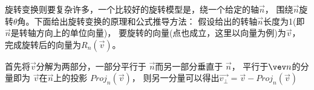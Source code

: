 \documentclass[UTF8]{ctexart}
\begin{document}
旋转变换则要复杂许多，一个比较好的旋转模型是，绕一个给定的轴$\vec n$，
围绕$\vec n$旋转$\theta$角。下面给出旋转变换的原理和公式推导方法：
假设给出的转轴$\vec n$长度为1(即$\vec n$是转轴方向上的单位向量)，
要旋转的向量(点也成立，这里以向量为例)为$\vec v$，
完成旋转后的向量为$R_n(\vec v)$。

首先将$\vec v$分解为两部分，一部分平行于
$\vec n$而另一部分垂直于
$\vec n$，
平行于$\vev n$的分量即为
$\vec v$在$\vec n$上的投影
$Proj_n(\vec v)$，
则另一分量可以得出$\vec{v_{\perp}} = \vec{v} - Proj_n(\vec v)$
\end{document}
